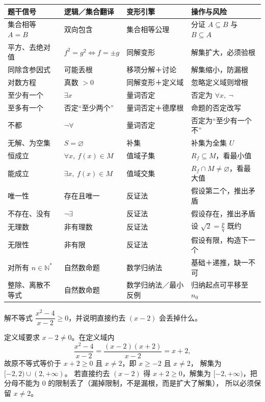 \begin{explore}
\begin{center}
\footnotesize
\setlength{\tabcolsep}{3pt}
\renewcommand{\arraystretch}{1.4}
\begin{tabular}{p{2.0cm}p{3.2cm}p{2.6cm}p{3.6cm}}
\toprule
题干信号 & 逻辑／集合翻译 & 变形引擎 & 操作与风险 \\
\midrule
集合相等 $A=B$ & 双向包含 & 集合相等公理 & 分证 $A\subseteq B$ 与 $B\subseteq A$ \\
\hline
平方、去绝对值 & $f^2=g^2\iff f=\pm g$ & 同解变形 & 解集扩大，必须验根 \\
\hline
同除含参因式 & 可能丢根 & 移项分解＋讨论 & 解集缩小，防漏根 \\
\hline
对数方程 & 真数 $>0$ & 同解变形＋定义域 & 忽略定义域则增根 \\
\hline
至少有一个 & $\exists x$ & 量词否定 & 否定为 $\forall x,\ \neg$ \\
\hline
至多有一个 & 否定“至少两个” & 量词否定＋德摩根 & 命题的否定改写 \\
\hline
不都 & $\neg\forall$ & 量词否定 & 否定为“至少有一个不” \\
\hline
无解、为空集 & $S=\varnothing$ & 补集 & 补集为全集 $U$ \\
\hline
恒成立 & $\forall x,\ f(x)\in M$ & 值域子集 & $R_f\subseteq M$，看最小值 \\
\hline
能成立 & $\exists x,\ f(x)\in M$ & 值域交集 & $R_f\cap M\neq\varnothing$，看最大值 \\
\hline
唯一性 & 存在且唯一 & 反证法 & 假设第二个，推出矛盾 \\
\hline
不存在、没有 & $\neg\exists$ & 反证法 & 假设存在，推出矛盾 \\
\hline
无理数 & 非有理数 & 反证法 & 设 $\sqrt2=\frac pq$ 既约 \\
\hline
无限性 & 非有限 & 反证法 & 假设有限，构造下一个 \\
\hline
对所有 $n\in\mathbb{N}^*$ & 自然数命题 & 数学归纳法 & 基础＋递推，缺一不可 \\
\hline
整除、离散不等式 & 自然数命题 & 数学归纳法／最小反例 & 归纳起点可平移至 $n_0$ \\
\bottomrule
\end{tabular}
\end{center}

\begin{example}
解不等式 $\dfrac{x^2-4}{x-2}\geq0$，并说明直接约去 $(x-2)$ 会丢掉什么。
\end{example}
\begin{solution}
定义域要求 $x-2\neq0$。在定义域内
\[
  \frac{x^2-4}{x-2}=\frac{(x-2)(x+2)}{x-2}=x+2,
\]
故原不等式等价于 $x+2\geq0$ 且 $x\neq2$，即 $x\geq-2$ 且 $x\neq2$，
解集为 $[-2,2)\cup(2,+\infty)$。
若直接约去 $(x-2)$ 得 $x+2\geq0$，解集为 $[-2,+\infty)$，把分母不能为 $0$ 的限制丢了（漏掉限制，不是漏根，而是扩大了解集），
所以必须保留 $x\neq2$。
\end{solution}


\end{explore}
